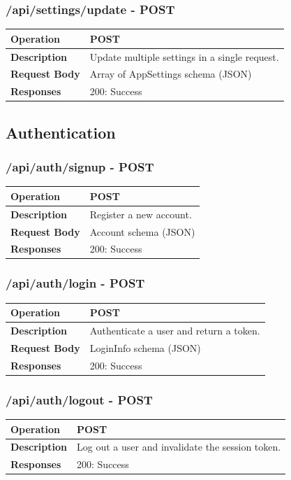 \subsubsection*{/api/settings/update - POST}
\begin{tabular}{|>{\raggedright\arraybackslash}p{3cm}|p{12cm}|}
\hline
\textbf{Operation} & POST \\
\hline
\textbf{Description} & Update multiple settings in a single request. \\
\hline
\textbf{Request Body} & Array of AppSettings schema (JSON) \\
\hline
\textbf{Responses} & 200: Success \\
\hline
\end{tabular}

\subsection{Authentication}

\subsubsection*{/api/auth/signup - POST}
\begin{tabular}{|>{\raggedright\arraybackslash}p{3cm}|p{12cm}|}
\hline
\textbf{Operation} & POST \\
\hline
\textbf{Description} & Register a new account. \\
\hline
\textbf{Request Body} & Account schema (JSON) \\
\hline
\textbf{Responses} & 200: Success \\
\hline
\end{tabular}

\subsubsection*{/api/auth/login - POST}
\begin{tabular}{|>{\raggedright\arraybackslash}p{3cm}|p{12cm}|}
\hline
\textbf{Operation} & POST \\
\hline
\textbf{Description} & Authenticate a user and return a token. \\
\hline
\textbf{Request Body} & LoginInfo schema (JSON) \\
\hline
\textbf{Responses} & 200: Success \\
\hline
\end{tabular}

\subsubsection*{/api/auth/logout - POST}
\begin{tabular}{|>{\raggedright\arraybackslash}p{3cm}|p{12cm}|}
\hline
\textbf{Operation} & POST \\
\hline
\textbf{Description} & Log out a user and invalidate the session token. \\
\hline
\textbf{Responses} & 200: Success \\
\hline
\end{tabular}

